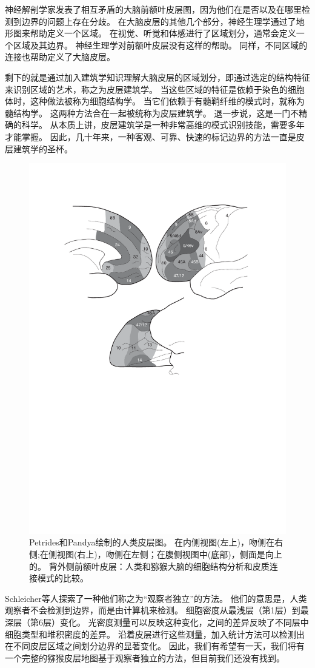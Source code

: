 \par
神经解剖学家发表了相互矛盾的大脑前额叶皮层图，因为他们在是否以及在哪里检测到边界的问题上存在分歧。
在大脑皮层的其他几个部分，神经生理学通过了地形图来帮助定义一个区域。
在视觉、听觉和体感进行了区域划分，通常会定义一个区域及其边界。
神经生理学对前额叶皮层没有这样的帮助。
同样，不同区域的连接也帮助定义了大脑皮层。
\par
剩下的就是通过加入建筑学知识理解大脑皮层的区域划分，即通过选定的结构特征来识别区域的艺术，称之为皮层建筑学。
当这些区域的特征是依赖于染色的细胞体时，这种做法被称为细胞结构学。
当它们依赖于有髓鞘纤维的模式时，就称为髓结构学。
这两种方法合在一起被统称为皮层建筑学。
退一步说，这是一门不精确的科学。
从本质上讲，皮层建筑学是一种非常高维的模式识别技能，需要多年才能掌握。
因此，几十年来，一种客观、可靠、快速的标记边界的方法一直是皮层建筑学的圣杯。


\begin{figure}[!htb]
	\centering
	\includegraphics[width=0.5\linewidth]{chap1/1_3}
	\caption{Petrides和Pandya绘制的人类皮层图\cite{petrides1999dorsolateral}。
		在内侧视图(左上)，吻侧在右侧;在侧视图(右上)，吻侧在左侧；在腹侧视图中(底部)，侧面是向上的。
		背外侧前额叶皮层：人类和猕猴大脑的细胞结构分析和皮质连接模式的比较。\label{fig:1_3}}
\end{figure}


\par
Schleicher等人探索了一种他们称之为“观察者独立”的方法\cite{schleicher1999observer}。
他们的意思是，人类观察者不会检测到边界，而是由计算机来检测。
细胞密度从最浅层（第1层）到最深层（第6层）变化。
光密度测量可以反映这种变化，之间的差异反映了不同层中细胞类型和堆积密度的差异。
沿着皮层进行这些测量，加入统计方法可以检测出在不同皮层区域之间划分边界的显著变化。
因此，我们有希望有一天，我们将有一个完整的猕猴皮层地图基于观察者独立的方法，但目前我们还没有找到。


